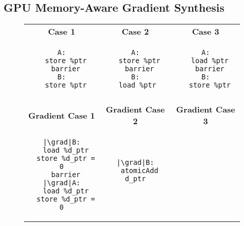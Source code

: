 

\subsection{GPU Memory-Aware Gradient Synthesis}
\label{subsec:memory_rules}



\begin{figure}[hb]
    \centering
 \begin{tabular}{c|c|c}
\textbf{Case 1}&\textbf{Case 2}&\textbf{Case 3}\\
\begin{minipage}[T]{0.3\linewidth}
\begin{verbatim}
A:
  store %ptr
  barrier
B:
  store %ptr
\end{verbatim}
\end{minipage}&%
\begin{minipage}[T]{0.3\linewidth}
\begin{verbatim}
A:
  store %ptr
  barrier
B:
  load %ptr 
\end{verbatim}
\end{minipage}&%
\begin{minipage}[T]{0.3\linewidth}
\begin{verbatim}
A:
  load %ptr
  barrier
B:
  store %ptr
\end{verbatim}
\end{minipage}
\\\\
\textbf{Gradient Case 1}&\textbf{Gradient Case 2}&\textbf{Gradient Case 3}\\
\begin{minipage}[T]{0.3\linewidth}
\begin{verbatim}
|\grad|B:
  load %d_ptr
  store %d_ptr = 0
  barrier
|\grad|A:
  load %d_ptr
  store %d_ptr = 0
\end{verbatim}
\end{minipage}&%
\begin{minipage}[T]{0.3\linewidth}
\begin{verbatim}
|\grad|B:
  atomicAdd d_ptr
  

\end{verbatim}
\end{minipage}
\end{tabular}
\end{figure}
